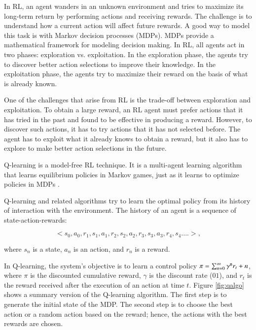 \documentclass{bmcart}
\begin{document}
In RL, an agent wanders in an unknown environment and tries to maximize its long-term return by performing actions and receiving rewards. The challenge is to understand how a current action will affect future rewards. A good way to model this task is with Markov decision processes (MDPs). MDPs provide a mathematical framework for modeling decision making. In RL, all agents act in two phases: exploration vs. exploitation. In the exploration phase, the agents try to discover better action selections to improve their knowledge. In the exploitation phase, the agents try to maximize their reward on the basis of what is already known.

One of the challenges that arise from RL is the trade-off between exploration and exploitation. To obtain a large reward, an RL
agent must prefer actions that it has tried in the past and found to be effective in producing a reward. However, to discover such actions, it has to try actions that it has not selected before. The agent has to exploit what it already knows to obtain a reward, but it also has to explore to make better action selections in the future.

Q-learning is a model-free RL technique. It is a multi-agent learning algorithm that learns equilibrium policies in Markov games, just as it learns to optimize policies in MDPs \citep{Greenwald2003}. 

Q-learning and related algorithms try to learn the optimal policy from its history of interaction with the environment. The history of an agent is a sequence of state-action-rewards:

\begin{equation}
<s_{0},a_{0},r_{1},s_{1},a_{1},r_{2},s_{2},a_{2},r_{3},s_{3},a_{3},r_{4},s_{4}....>,
\end{equation}

where $s_{n}$ is a state, $a_{n}$ is an action, and $r_{n}$ is a reward.

In Q-learning, the system's objective is to learn a control policy $\pi = \sum_{n=0}^{\infty} \gamma\textsuperscript{n}  r_{t}+n $, where $\pi$  is the discounted cumulative reward, $\gamma$ is the discount rate ($01$), and $r_{t}$ is the reward received after the execution of an action at time $t$. Figure \ref{fig:qalgo} shows a summary version of the Q-learning algorithm. The first step is to generate the initial state of the MDP. The second step is to choose the best action or a random action based on the reward; hence, the actions with the best rewards are chosen.
\end{document}
